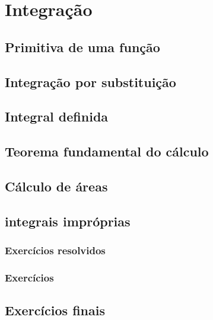
\chapter{Integração}\label{cap:integracao}

\emconstrucao

\section{Primitiva de uma função}

\construirSec
\section{Integração por substituição}
\section{Integral definida}
\section{Teorema fundamental do cálculo}
\section{Cálculo de áreas}
\section{integrais impróprias}



\subsection*{Exercícios resolvidos}

\construirExeresol


\subsection*{Exercícios}

\construirExer

\section{Exercícios finais}

\construirExer


